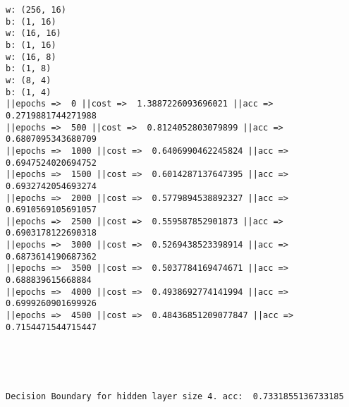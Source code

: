 \documentclass[11pt]{article}
\begin{document}
    \begin{Verbatim}[commandchars=\\\{\}]
w: (256, 16)
b: (1, 16)
w: (16, 16)
b: (1, 16)
w: (16, 8)
b: (1, 8)
w: (8, 4)
b: (1, 4)
||epochs =>  0 ||cost =>  1.3887226093696021 ||acc =>  0.2719881744271988
||epochs =>  500 ||cost =>  0.8124052803079899 ||acc =>  0.6807095343680709
||epochs =>  1000 ||cost =>  0.6406990462245824 ||acc =>  0.6947524020694752
||epochs =>  1500 ||cost =>  0.6014287137647395 ||acc =>  0.6932742054693274
||epochs =>  2000 ||cost =>  0.5779894538892327 ||acc =>  0.6910569105691057
||epochs =>  2500 ||cost =>  0.559587852901873 ||acc =>  0.6903178122690318
||epochs =>  3000 ||cost =>  0.5269438523398914 ||acc =>  0.6873614190687362
||epochs =>  3500 ||cost =>  0.5037784169474671 ||acc =>  0.688839615668884
||epochs =>  4000 ||cost =>  0.4938692774141994 ||acc =>  0.6999260901699926
||epochs =>  4500 ||cost =>  0.48436851209077847 ||acc =>  0.7154471544715447

    \end{Verbatim}

    \begin{center}
    \end{center}
    { \hspace*{\fill} \\}
    
    \begin{center}
    \end{center}
    { \hspace*{\fill} \\}
    
    \begin{Verbatim}[commandchars=\\\{\}]
Decision Boundary for hidden layer size 4. acc:  0.7331855136733185

    \end{Verbatim}
\end{document}

